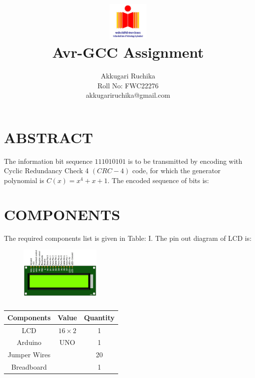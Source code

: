 \documentclass[conference]{IEEEtran}
\title{
\vspace{1cm}
{\includegraphics[width=0.15\textwidth]{iithlogo.jpg} \\ Avr-GCC Assignment} }
\author{Akkugari Ruchika \\ Roll No: FWC22276 \\ akkugariruchika@gmail.com}
\begin{document}
\maketitle
 \section {ABSTRACT}
 The information bit sequence ${1 1 1 0 1 0 1 0 1}$ is to be transmitted  by encoding with Cyclic Redundancy Check 4 $(CRC-4)$ code, for which the generator polynomial is $C(x)=x^{4}+x+1$. The encoded sequence of bits is: 
\section{COMPONENTS}
The required components list is given in Table: I. The pin out diagram of LCD is:
 \begin{figure}[h]
	 \centering
	 \includegraphics[width=0.35\textwidth]{lcd.png}
	 \caption{\label{fig:LCD}}
 \end{figure}
  \begin{table} [htbp]
\centering
\begin{tabular}{| c | c | c |} \hline
Components & Value & Quantity \\\hline
	LCD & $16\times2$ & 1 \\ \hline
Arduino & UNO & 1 \\ \hline
Jumper Wires &  & 20 \\ \hline
Breadboard & & 1 \\ 
\hline
\end{tabular}
\vspace{0.1cm}
\caption{\label{tab:widgets}}
\end{table}\\
\end{document}
